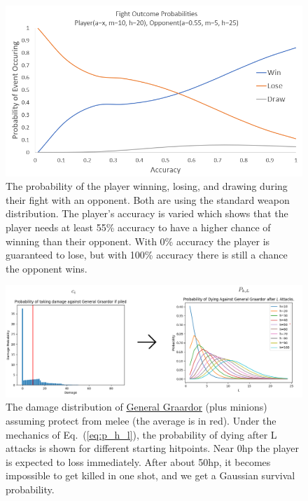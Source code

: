 		



	\begin{figure}
		\centering
		\includegraphics[width=\linewidth]{img/combat/fight_outcome_probabilities.png}
		\caption{
			The probability of the player winning, losing, and drawing during their fight with an opponent. Both are using the standard weapon distribution. The player's accuracy is varied which shows that the player needs at least 55\% accuracy to have a higher chance of winning than their opponent. With 0\% accuracy the player is guaranteed to lose, but with 100\% accuracy there is still a chance the opponent wins.
		}
		\label{fig:fight_outcome_probabilities}
	\end{figure}


	\begin{figure}
		\centering
		\includegraphics[width=\linewidth]{img/combat/bandos_slim.png}
		\caption{
			The damage distribution of \href{https://oldschool.runescape.wiki/w/General_Graardor}{General Graardor} (plus minions) assuming protect from melee (the average is in red). Under the mechanics of Eq.~(\ref{eq:p_h_l}), the probability of dying after L attacks is shown for different starting hitpoints. Near 0hp the player is expected to loss immediately. After about 50hp, it becomes impossible to get killed in one shot, and we get a Gaussian survival probability.
		}
		\label{fig:bandos}
	\end{figure}


